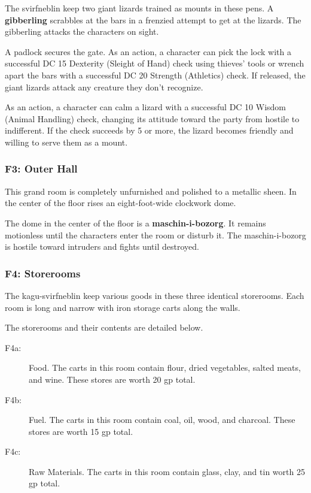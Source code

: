 \documentclass[10pt,a4paper,twoside,bg=print,twocolumn,openany,nodeprecatedcode]{dndbook}
\begin{document}
The svirfneblin keep two giant lizards trained as mounts in these pens. A \textbf{gibberling} scrabbles at the bars in a frenzied attempt to get at the lizards. The gibberling attacks the characters on sight.

A padlock secures the gate. As an action, a character can pick the lock with a successful DC 15 Dexterity (Sleight of Hand) check using thieves' tools or wrench apart the bars with a successful DC 20 Strength (Athletics) check. If released, the giant lizards attack any creature they don't recognize.

As an action, a character can calm a lizard with a successful DC 10 Wisdom (Animal Handling) check, changing its attitude toward the party from hostile to indifferent. If the check succeeds by 5 or more, the lizard becomes friendly and willing to serve them as a mount.

\subsubsection{F3: Outer Hall}
\begin{DndReadAloud}{}
This grand room is completely unfurnished and polished to a metallic sheen. In the center of the floor rises an eight-foot-wide clockwork dome.

\end{DndReadAloud}

The dome in the center of the floor is a \textbf{maschin-i-bozorg}. It remains motionless until the characters enter the room or disturb it. The maschin-i-bozorg is hostile toward intruders and fights until destroyed.

\subsubsection{F4: Storerooms}
The kagu-svirfneblin keep various goods in these three identical storerooms. Each room is long and narrow with iron storage carts along the walls.

The storerooms and their contents are detailed below.


\begin{description}
\item[F4a:]
Food. The carts in this room contain flour, dried vegetables, salted meats, and wine. These stores are worth 20 gp total.
\item[F4b:]
Fuel. The carts in this room contain coal, oil, wood, and charcoal. These stores are worth 15 gp total.
\item[F4c:]
Raw Materials. The carts in this room contain glass, clay, and tin worth 25 gp total.
\end{description}
\end{document}
